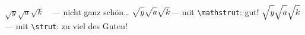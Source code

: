 \\
\usepackage{import}

	$\sqrt{y}\sqrt{a}\sqrt{k}$	\ \,--- nicht ganz schön\dots
	$\sqrt{\mathstrut y} \sqrt{\mathstrut a} \sqrt{\mathstrut k}$--- mit \texttt{\textbackslash mathstrut}: gut!
	$\sqrt{\strut y} \sqrt{\strut a} \sqrt{\strut k}$--- mit \texttt{\textbackslash strut}: zu viel des Guten!

